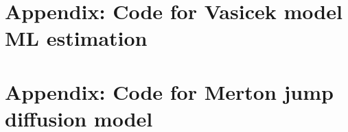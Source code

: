 \documentclass[11pt,reqno,final]{amsart}
\begin{document}
%
%


%
%
\newpage
\section*{Appendix: Code for Vasicek model ML estimation}


\newpage
\section*{Appendix: Code for Merton jump diffusion model }

\end{document}
